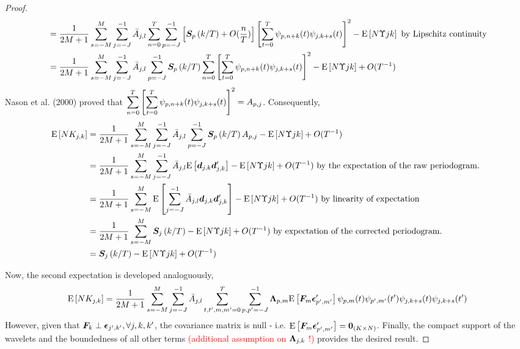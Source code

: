 \documentclass[main_document.tex]{subfiles}
\begin{document}
\begin{proof}
\begin{align*}
							&= \frac{\displaystyle 1}{\displaystyle 2M+1}\sum_{s=-M}^{M} \scalesum{j} \invA{j}{l} \locsum{n} \scalesum{p} \left[\CEWS{p}{k} + O(\frac{n}{T})\right] \left[\locsum{t}\wavelet{p}{n+k}{t}\wavelet{j}{k+s}{t}\right]^{2} - \E{N\Upsilon{j}{k}} \text{ by Lipschitz continuity} \\
							&= \frac{\displaystyle 1}{\displaystyle 2M+1}\sum_{s=-M}^{M} \scalesum{j} \invA{j}{l}  \scalesum{p} \CEWS{p}{k} \locsum{n}\left[\locsum{t}\wavelet{p}{n+k}{t}\wavelet{j}{k+s}{t}\right]^{2} - \E{N\Upsilon{j}{k}} + O(T^{-1})
		\end{align*}
		Nason et al. (2000) proved that $\locsum{n}\left[\locsum{t}\wavelet{p}{n+k}{t}\wavelet{j}{k+s}{t}\right]^{2} = A_{p,j}$. Consequently, 
		\begin{align*}
			\E{N K_{j,k}} &= \frac{\displaystyle 1}{\displaystyle 2M+1}\sum_{s=-M}^{M} \scalesum{j} \invA{j}{l}  \scalesum{p} \CEWS{p}{k} A_{p,j} - \E{N\Upsilon{j}{k}} + O(T^{-1}) \\
						&= \frac{\displaystyle 1}{\displaystyle 2M+1}\sum_{s=-M}^{M} \scalesum{j} \invA{j}{l}  \E{\coeffs{j}{k}\coeffs{j}{k}'} - \E{N\Upsilon{j}{k}} + O(T^{-1}) \text{ by the expectation of the raw periodogram. }\\
						&= \frac{\displaystyle 1}{\displaystyle 2M+1}\sum_{s=-M}^{M} \E{\scalesum{j} \invA{j}{l} \coeffs{j}{k}\coeffs{j}{k}'} - \E{N\Upsilon{j}{k}} + O(T^{-1}) \text{ by linearity of expectation}\\
						&= \frac{\displaystyle 1}{\displaystyle 2M+1}\sum_{s=-M}^{M} \CEWS{j}{k} - \E{N\Upsilon{j}{k}} + O(T^{-1}) \text{ by expectation of the corrected periodogram.}\\
						&= \CEWS{j}{k} - \E{N\Upsilon{j}{k}} + O(T^{-1}) 
		\end{align*}

		Now, the second expectation is developed analoguously,
		\begin{align*}
			\E{N K_{j,k}} = \frac{\displaystyle 1}{\displaystyle 2M+1}\sum_{s=-M}^{M} \scalesum{j} \invA{j}{l} \locsum{t,t',m,m'} \scalesum{p,p'} \loadings{p}{m} \E{\factors{m}\idioError{p'}{m'}'} \wavelet{p}{m}{t}\wavelet{p'}{m'}{t'}\wavelet{j}{k+s}{t}\wavelet{j}{k+s}{t'}
		\end{align*}
		However, given that $\bm{F}_{k} \perp \bm{\epsilon}_{j',k'}, \forall j,k,k'$, the covariance matrix is null - i.e. $\mathrm{E}\left[\bm{F}_{m}\bm{\epsilon}_{p',m'}'\right] = \bm{0}_{(K \times N)}$. Finally, the compact support of the wavelets and the boundedness of all other terms \textcolor{red}{(additional assumption on $\bm{\Lambda}_{j,k}$ !)} provides the desired result. 
	\end{proof}
\end{document}
